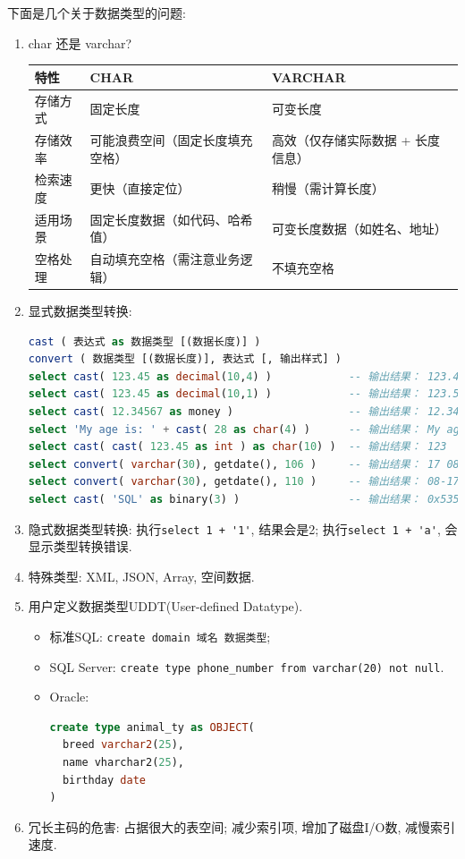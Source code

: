 下面是几个关于数据类型的问题:
\begin{enumerate}
    \item char 还是 varchar?
    \begin{table}[H]
      \centering
      \begin{tabular}{|l|l|l|}
        \hline
        \textbf{特性} & \textbf{CHAR} & \textbf{VARCHAR} \\ \hline
        存储方式 &	固定长度 & 可变长度 \\ \hline
        存储效率 & 可能浪费空间（固定长度填充空格） &	高效（仅存储实际数据 + 长度信息）\\ \hline
        检索速度 & 更快（直接定位）& 稍慢（需计算长度） \\ \hline
        适用场景 & 固定长度数据（如代码、哈希值） &	可变长度数据（如姓名、地址） \\ \hline
        空格处理 & 自动填充空格（需注意业务逻辑） &	不填充空格 \\ \hline
      \end{tabular}
    \end{table}
    \item 显式数据类型转换: 
    \begin{lstlisting}[language=SQL]
cast ( 表达式 as 数据类型 [(数据长度)] )
convert ( 数据类型 [(数据长度)], 表达式 [, 输出样式] )
select cast( 123.45 as decimal(10,4) )            -- 输出结果： 123.4500
select cast( 123.45 as decimal(10,1) )            -- 输出结果： 123.5
select cast( 12.34567 as money )                  -- 输出结果： 12.3457
select 'My age is: ' + cast( 28 as char(4) )      -- 输出结果： My age is: 28
select cast( cast( 123.45 as int ) as char(10) )  -- 输出结果： 123
select convert( varchar(30), getdate(), 106 )     -- 输出结果： 17 08 2012
select convert( varchar(30), getdate(), 110 )     -- 输出结果： 08-17-2012
select cast( 'SQL' as binary(3) )                 -- 输出结果： 0x53514C
    \end{lstlisting}
    \item 隐式数据类型转换: 执行\verb|select 1 + '1'|, 结果会是2; 执行\verb|select 1 + 'a'|, 会显示类型转换错误.
    \item 特殊类型: XML, JSON, Array, 空间数据.
    \item 用户定义数据类型UDDT(User-defined Datatype).
    \begin{itemize}
      \item 标准SQL: \verb|create domain 域名 数据类型|;
      \item SQL Server: \verb|create type phone_number from varchar(20) not null|.
      \item Oracle: 
      \begin{lstlisting}[language=SQL]
create type animal_ty as OBJECT(
  breed varchar2(25),
  name vharchar2(25),
  birthday date
)
      \end{lstlisting}
    \end{itemize}
    \item 冗长主码的危害: 占据很大的表空间; 减少索引项, 增加了磁盘I/O数, 减慢索引速度.
\end{enumerate}

